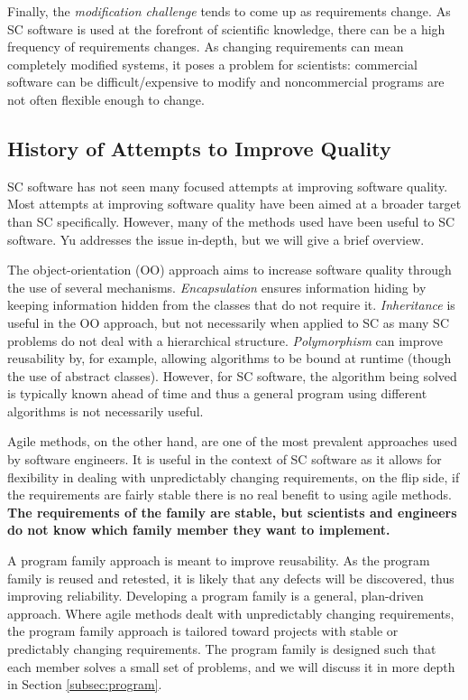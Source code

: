 \documentclass[10pt, preprint]{sigplanconf}
\begin{document}
Finally, the \textit{modification challenge} tends to come up as requirements
change. As SC software is used at the forefront of scientific knowledge, there
can be a high frequency of requirements changes. As changing requirements can
mean completely modified systems, it poses a problem for scientists: commercial
software can be difficult/expensive to modify and noncommercial programs are not
often flexible enough to change.

\subsection{History of Attempts to Improve Quality} \label{subsec:history}

SC software has not seen many focused attempts at improving software
quality. Most attempts at improving software quality have been aimed at a
broader target than SC specifically. However, many of the methods used have been
useful to SC software. Yu \cite{Yu2011} addresses the issue in-depth, but we
will give a brief overview.

The object-orientation (OO) approach aims to increase software quality through
the use of several mechanisms. \textit{Encapsulation} ensures information hiding
\cite{Parnas1972} by keeping information hidden from the classes that do not
require it. \textit{Inheritance} is useful in the OO approach, but not
necessarily when applied to SC as many SC problems do not deal with a
hierarchical structure. \textit{Polymorphism} can improve reusability by, for
example, allowing algorithms to be bound at runtime (though the use of abstract
classes). However, for SC software, the algorithm being solved is typically
known ahead of time and thus a general program using different algorithms is not
necessarily useful.

Agile methods, on the other hand, are one of the most prevalent approaches used
by software engineers. It is useful in the context of SC software as it allows
for flexibility in dealing with unpredictably changing requirements, on the flip
side, if the requirements are fairly stable there is no real benefit to using
agile methods.  \textbf{The requirements of the family are stable, but
  scientists and engineers do not know which family member they want to
  implement.}

A program family approach is meant to improve reusability. As the program family
is reused and retested, it is likely that any defects will be discovered, thus
improving reliability. Developing a program family is a general, plan-driven
approach. Where agile methods dealt with unpredictably changing requirements,
the program family approach is tailored toward projects with stable or
predictably changing requirements. The program family is designed such that each
member solves a small set of problems, and we will discuss it in more depth in
Section \ref{subsec:program}. %
\end{document}
